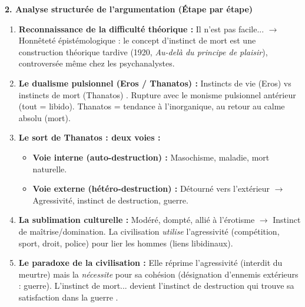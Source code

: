 \documentclass[11pt]{article}
\newcommand{\cle}[1]{{\popxbold\color{popdark}#1}}
\begin{document}
\begin{exoresolu}
\textbf{2. Analyse structurée de l'argumentation (Étape par étape)}
\begin{enumerate}
    \item \textbf{Reconnaissance de la difficulté théorique :} \guillemotleft Il n'est pas facile... \guillemotright $\rightarrow$ Honnêteté épistémologique : le concept d'instinct de mort est une \cle{construction théorique} tardive (1920, \emph{Au-delà du principe de plaisir}), controversée même chez les psychanalystes.
    \item \textbf{Le dualisme pulsionnel (Eros / Thanatos) :} \guillemotleft Instincts de vie (Eros) vs instincts de mort (Thanatos) \guillemotright. Rupture avec le monisme pulsionnel antérieur (tout = libido). Thanatos = tendance à l'inorganique, au retour au calme absolu (mort).
    \item \textbf{Le sort de Thanatos : deux voies :}
        \begin{itemize}
            \item \textbf{Voie interne (auto-destruction) :} Masochisme, maladie, mort naturelle.
            \item \textbf{Voie externe (hétéro-destruction) :} \guillemotleft Détourné vers l'extérieur \guillemotright $\rightarrow$ \cle{Agressivité}, \cle{instinct de destruction}, \cle{guerre}.
        \end{itemize}
    \item \textbf{La sublimation culturelle :} \guillemotleft Modéré, dompté, allié à l'érotisme \guillemotright $\rightarrow$ \cle{Instinct de maîtrise/domination}. La civilisation \emph{utilise} l'agressivité (compétition, sport, droit, police) pour lier les hommes (\cle{liens libidinaux}).
    \item \textbf{Le paradoxe de la civilisation :} Elle réprime l'agressivité (interdit du meurtre) mais la \emph{nécessite} pour sa cohésion (désignation d'ennemis extérieurs : guerre). \guillemotleft L'instinct de mort... devient l'instinct de destruction qui trouve sa satisfaction dans la guerre \guillemotright.
\end{enumerate}


\end{exoresolu}
\end{document}

